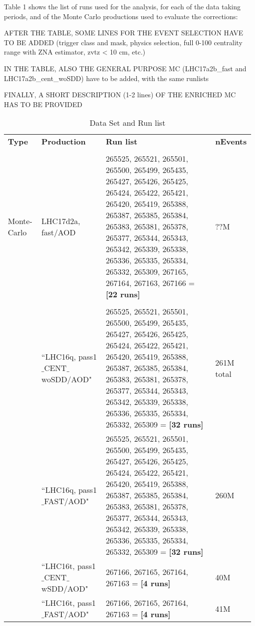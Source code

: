 Table 1 shows the list of runs used for the analysis, for each of the data taking periods, and of the Monte Carlo productions used to evaluate the corrections:

AFTER THE TABLE, SOME LINES FOR THE EVENT SELECTION HAVE TO BE ADDED (trigger class and mask, physics selection, full 0-100 centrality range with ZNA estimator, zvtz < 10 cm, etc.)

IN THE TABLE, ALSO THE GENERAL PURPOSE MC (LHC17a2b_fast and LHC17a2b_cent_woSDD) have to be added, with the same runlists

FINALLY, A SHORT DESCRIPTION (1-2 lines) OF THE ENRICHED MC HAS TO BE PROVIDED

 \vspace{10 mm}

\begin{table}[h]
\begin{tabular}{ p{1.2cm} | p{4.2cm} |  p{7cm} |  p{1.2cm}}
{\normalsize \textbf {Type}} &       {\normalsize \textbf {Production}} &       {\normalsize \textbf {Run list}} & {\normalsize \textbf {nEvents}} \\
\\ \hline
Monte-Carlo & LHC17d2a, fast/AOD &265525, 265521, 265501, 265500, 265499, 265435, 265427, 265426, 265425, 265424, 265422, 265421, 265420, 265419, 265388, 265387, 265385, 265384, 265383, 265381, 265378, 265377, 265344, 265343, 265342, 265339, 265338, 265336, 265335, 265334, 265332, 265309, 267165, 267164, 267163, 267166 = \textbf{[22 runs]} & ??M\\
\\ \hline

\multirow{7}{*}{} Data&``LHC16q, pass1$\_$CENT$\_$woSDD/AOD" & 265525, 265521, 265501, 265500, 265499, 265435, 265427, 265426, 265425, 265424, 265422, 265421, 265420, 265419, 265388, 265387, 265385, 265384, 265383, 265381, 265378, 265377, 265344, 265343, 265342, 265339, 265338, 265336, 265335, 265334, 265332, 265309 = \textbf{[32 runs]}& 261M total\\
                  &``LHC16q, pass1$\_$FAST/AOD" &265525, 265521, 265501, 265500, 265499, 265435, 265427, 265426, 265425, 265424, 265422, 265421, 265420, 265419, 265388, 265387, 265385, 265384, 265383, 265381, 265378, 265377, 265344, 265343, 265342, 265339, 265338, 265336, 265335, 265334, 265332, 265309 = \textbf{[32 runs]} & 260M \\
 & ``LHC16t, pass1$\_$CENT$\_$wSDD/AOD" & 267166, 267165, 267164, 267163 = \textbf{[4 runs]} & 40M \\
  & ``LHC16t, pass1$\_$FAST/AOD" & 267166, 267165, 267164, 267163 = \textbf{[4 runs]} & 41M \\
 \hline \hline
\end{tabular}
\\
\caption {Data Set and Run list}
\end{table} 